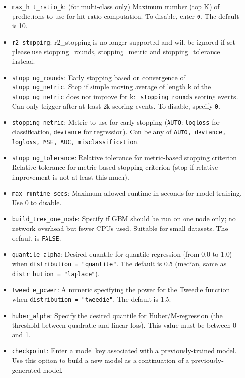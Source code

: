 \begin{itemize}
\item {\texttt{max\_hit\_ratio\_k}}: (for multi-class only) Maximum number (top K) of predictions to use for hit ratio computation.  To disable, enter  {\texttt{0}}. The default is 10.
\item {\texttt{r2\_stopping}}: r2_stopping is no longer supported and will be ignored if set - please use stopping_rounds, stopping_metric and stopping_tolerance instead.
\item \texttt{stopping\_rounds}: Early stopping based on convergence of \\\texttt{stopping\_metric}. Stop if simple moving average of length k of the \texttt{stopping\_metric} does not improve for k:=\texttt{stopping\_rounds} scoring events. Can only trigger after at least 2k scoring events. To disable, specify \texttt{0}.
\item \texttt{stopping\_metric}: Metric to use for early stopping (\texttt{AUTO}: \texttt{logloss} for classification, \texttt{deviance} for regression). Can be any of \texttt{AUTO, deviance, logloss, MSE, AUC, misclassification}.
\item \texttt{stopping\_tolerance}: Relative tolerance for metric-based stopping criterion Relative tolerance for metric-based stopping criterion (stop if relative improvement is not at least this much).
\item \texttt{max\_runtime\_secs}: Maximum allowed runtime in seconds for model training. Use 0 to disable.
\item {\texttt{build\_tree\_one\_node}}: Specify if GBM should be run on one node only; no network overhead but fewer CPUs used. Suitable for small datasets.  The default is {\texttt{FALSE}}.
\item {\texttt{quantile\_alpha}}: Desired quantile for quantile regression (from 0.0 to 1.0) when \texttt{distribution = "quantile"}.  The default is 0.5 (median, same as \texttt{distribution = "laplace"}).
\item {\texttt{tweedie\_power}}: A numeric specifying the power for the Tweedie function when \texttt{distribution = "tweedie"}.  The default is 1.5.
\item \texttt{huber\_alpha}: Specify the desired quantile for Huber/M-regression (the threshold between quadratic and linear loss). This value must be between 0 and 1.
\item {\texttt{checkpoint}}: Enter a model key associated with a previously-trained model. Use this option to build a new model as a continuation of a previously-generated model.

\end{itemize}
